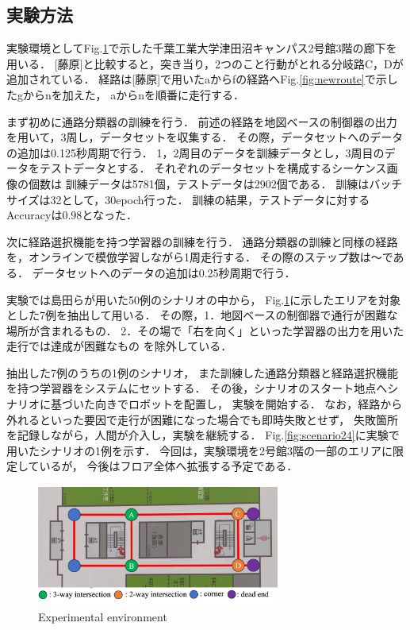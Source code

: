 \documentclass{sice-si}
\begin{document}
\subsection{実験方法}
実験環境としてFig.\ref{fig:cit3f}で示した千葉工業大学津田沼キャンパス2号館3階の廊下を用いる．
[藤原]と比較すると，突き当り，2つのこと行動がとれる分岐路C，Dが追加されている．
経路は[藤原]で用いたaからfの経路へFig.\ref{fig:newroute}で示したgからnを加えた，
aからnを順番に走行する．\par
まず初めに通路分類器の訓練を行う．
前述の経路を地図ベースの制御器の出力を用いて，3周し，データセットを収集する．
その際，データセットへのデータの追加は0.125秒周期で行う．
1，2周目のデータを訓練データとし，3周目のデータをテストデータとする．
それぞれのデータセットを構成するシーケンス画像の個数は
訓練データは5781個，テストデータは2902個である．
訓練はバッチサイズは32として，30epoch行った．
訓練の結果，テストデータに対するAccuracyは0.98となった．\par
次に経路選択機能を持つ学習器の訓練を行う．
通路分類器の訓練と同様の経路を，オンラインで模倣学習しながら1周走行する．
その際のステップ数は〜である．
データセットへのデータの追加は0.25秒周期で行う．\par
実験では島田らが用いた50例のシナリオの中から，
Fig.\ref{fig:cit3f}に示したエリアを対象とした7例を抽出して用いる．
その際，1．地図ベースの制御器で通行が困難な場所が含まれるもの．
2．その場で「右を向く」といった学習器の出力を用いた走行では達成が困難なもの
を除外している．\par
抽出した7例のうちの1例のシナリオ，
また訓練した通路分類器と経路選択機能を持つ学習器をシステムにセットする．
その後，シナリオのスタート地点へシナリオに基づいた向きでロボットを配置し，
実験を開始する．
なお，経路から外れるといった要因で走行が困難になった場合でも即時失敗とせず，
失敗箇所を記録しながら，人間が介入し，実験を継続する．
Fig.\ref{fig:scenario24}に実験で用いたシナリオの1例を示す．
今回は，実験環境を2号館3階の一部のエリアに限定しているが，
今後はフロア全体へ拡張する予定である．
\begin{figure}[htbp]
    \centering
     \includegraphics[height=40mm,width=80mm]{./figs/keiro.png}
     \caption{Experimental environment}\label{fig:cit3f}
\end{figure}
\end{document}

